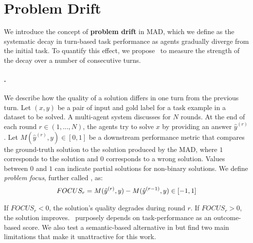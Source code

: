 \section{Problem Drift} \label{sec:definition}

We introduce the concept of \textbf{problem drift} in MAD, which we define as the systematic decay in turn-based task performance as agents gradually diverge from the initial task. 
To quantify this effect, we propose \metric\ to measure the strength of the decay over a number of consecutive turns.

\paragraph{\textbf{\metric.}}
We describe how the quality of a solution differs in one turn from the previous turn.
Let $(x, y)$ be a pair of input and gold label for a task example in a dataset to be solved. 
A multi-agent system discusses for $N$ rounds.
At the end of each round $r \in (1, ..., N)$, the agents try to solve $x$ by providing an answer $\hat{y}^{(r)}$. 
Let $M(\hat{y}^{(r)}, y) \in [0,1]$ be a downstream performance metric that compares the ground-truth solution to the solution produced by the MAD, where $1$ corresponds to the solution and $0$ corresponds to a wrong solution.
Values between $0$ and $1$ can indicate partial solutions for non-binary solutions.
We define \textit{problem focus}, further called \metric, as:
\vspace*{2mm}
\begin{equation} \label{def:focus}
\small
FOCUS_r = M(\hat{y}^{(r)}, y) - M(\hat{y}^{(r-1)}, y) \in [-1,1]
\end{equation}

\noindent
If $FOCUS_r < 0$, the solution's quality degrades during round $r$. If $FOCUS_r > 0$, the solution improves.
\metric\ purposely depends on task-performance as an outcome-based score.
We also test a semantic-based alternative in  but find two main limitations that make it unattractive for this work.

